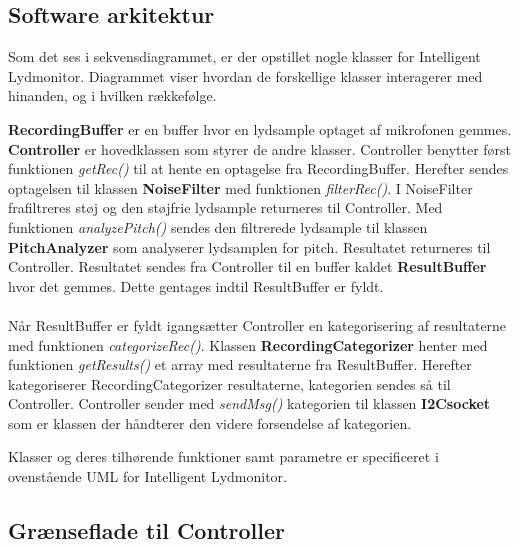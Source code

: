 \newpage
\subsection{Software arkitektur}

Som det ses i sekvensdiagrammet, er der opstillet nogle klasser for Intelligent Lydmonitor. Diagrammet viser hvordan de forskellige klasser interagerer med hinanden, og i hvilken rækkefølge. 

\textbf{RecordingBuffer} er en buffer hvor en lydsample optaget af mikrofonen gemmes.
\textbf{Controller} er hovedklassen som styrer de andre klasser. Controller benytter først funktionen \textit{getRec()} til at hente en optagelse fra RecordingBuffer. Herefter sendes optagelsen til klassen \textbf{NoiseFilter} med funktionen \textit{filterRec()}. I NoiseFilter frafiltreres støj og den støjfrie lydsample returneres til Controller. Med funktionen \textit{analyzePitch()} sendes den filtrerede lydsample til klassen \textbf{PitchAnalyzer} som analyserer lydsamplen for pitch. Resultatet returneres til Controller. Resultatet sendes fra Controller til en buffer kaldet \textbf{ResultBuffer} hvor det gemmes. Dette gentages indtil ResultBuffer er fyldt. \\ \\
Når ResultBuffer er fyldt igangsætter Controller en kategorisering af resultaterne med funktionen \textit{categorizeRec()}. Klassen \textbf{RecordingCategorizer} henter med funktionen \textit{getResults()} et array med resultaterne fra ResultBuffer. Herefter kategoriserer RecordingCategorizer resultaterne, kategorien sendes så til Controller. Controller sender med \textit{sendMsg()} kategorien til klassen \textbf{I2Csocket} som er klassen der håndterer den videre forsendelse af kategorien. 

Klasser og deres tilhørende funktioner samt parametre er specificeret i ovenstående UML for Intelligent Lydmonitor. 




\subsection*{Grænseflade til Controller}